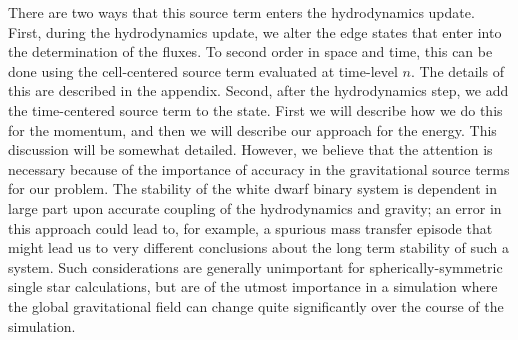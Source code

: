 \documentclass[iop]{emulateapj}
\begin{document}
There are two ways that this source term enters the hydrodynamics update.
First, during the hydrodynamics update, we alter the edge states that enter
into the determination of the fluxes. To second order in space and time, 
this can be done using the cell-centered
source term evaluated at time-level $n$. The details of this are described in 
the appendix. Second, after the hydrodynamics step, we add the time-centered source term
to the state. First we will describe how we do this for the momentum,
and then we will describe our approach for the energy. This discussion will be somewhat detailed.
However, we believe that the attention is necessary because of the importance of accuracy
in the gravitational source terms for our problem. The stability of the white dwarf binary
system is dependent in large part upon accurate coupling of the hydrodynamics and gravity;
an error in this approach could lead to, for example, a spurious mass transfer episode
that might lead us to very different conclusions about the long term stability of such a system.
Such considerations are generally unimportant for spherically-symmetric single star calculations,
but are of the utmost importance in a simulation where the global gravitational field can change 
quite significantly over the course of the simulation.
\end{document}
